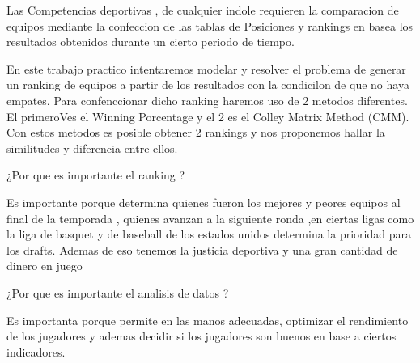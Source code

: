 Las Competencias deportivas , de cualquier indole requieren la comparacion de equipos
mediante la confeccion de las tablas de Posiciones y rankings en basea los resultados obtenidos
durante un cierto periodo de tiempo.


En este trabajo practico intentaremos modelar y 
resolver el problema de generar un ranking de equipos a partir de los 
resultados con la condicilon de que no haya empates. 
Para confenccionar dicho ranking haremos uso de 2 metodos diferentes.
El primeroVes el Winning Porcentage y el 2 es el Colley Matrix Method (CMM).
Con estos metodos es posible obtener 2 rankings y nos proponemos hallar
la similitudes y diferencia entre ellos.

¿Por que es importante el ranking ?

Es importante porque determina quienes fueron los mejores y peores equipos al final
de la temporada , quienes avanzan a la siguiente ronda ,en ciertas
ligas como  la liga de basquet y de baseball de los estados unidos 
determina la prioridad para los drafts.
Ademas de eso tenemos la justicia deportiva y una gran cantidad de dinero en juego

¿Por que es importante el analisis de datos ?

Es importanta porque permite en las manos adecuadas, optimizar el
rendimiento de los jugadores y ademas decidir si los jugadores son buenos en base a ciertos 
indicadores.







